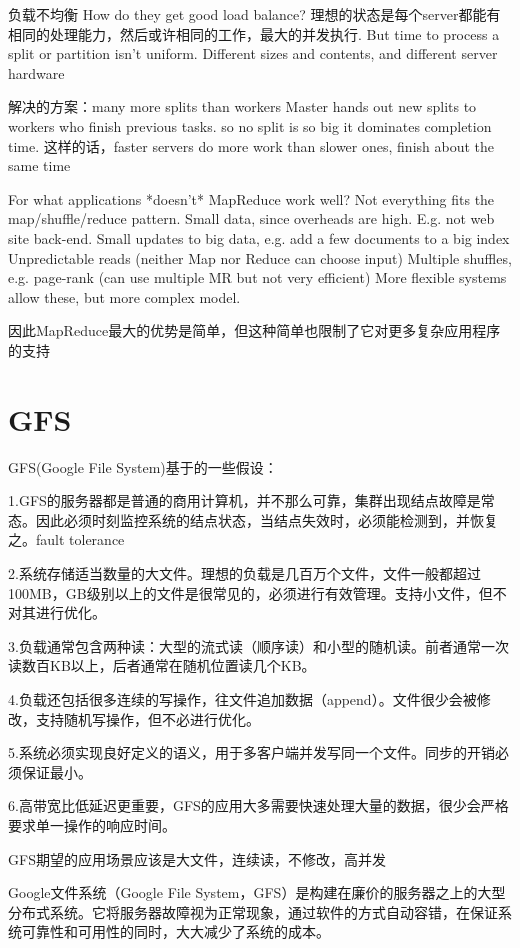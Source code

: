 负载不均衡
How do they get good load balance?
理想的状态是每个server都能有相同的处理能力，然后或许相同的工作，最大的并发执行.
But time to process a split or partition isn't uniform.
Different sizes and contents, and different server hardware

解决的方案：many more splits than workers
Master hands out new splits to workers who finish previous tasks.
so no split is so big it dominates completion time.
这样的话，faster servers do more work than slower ones, finish about the same time

For what applications *doesn't* MapReduce work well?
  Not everything fits the map/shuffle/reduce pattern.
  Small data, since overheads are high. E.g. not web site back-end.
  Small updates to big data, e.g. add a few documents to a big index
  Unpredictable reads (neither Map nor Reduce can choose input)
  Multiple shuffles, e.g. page-rank (can use multiple MR but not very efficient)
  More flexible systems allow these, but more complex model.

因此MapReduce最大的优势是简单，但这种简单也限制了它对更多复杂应用程序的支持

\section{GFS}
GFS(Google File System)基于的一些假设：

1.GFS的服务器都是普通的商用计算机，并不那么可靠，集群出现结点故障是常态。因此必须时刻监控系统的结点状态，当结点失效时，必须能检测到，并恢复之。fault tolerance

2.系统存储适当数量的大文件。理想的负载是几百万个文件，文件一般都超过100MB，GB级别以上的文件是很常见的，必须进行有效管理。支持小文件，但不对其进行优化。

3.负载通常包含两种读：大型的流式读（顺序读）和小型的随机读。前者通常一次读数百KB以上，后者通常在随机位置读几个KB。

4.负载还包括很多连续的写操作，往文件追加数据（append）。文件很少会被修改，支持随机写操作，但不必进行优化。

5.系统必须实现良好定义的语义，用于多客户端并发写同一个文件。同步的开销必须保证最小。

6.高带宽比低延迟更重要，GFS的应用大多需要快速处理大量的数据，很少会严格要求单一操作的响应时间。

GFS期望的应用场景应该是大文件，连续读，不修改，高并发

Google文件系统（Google File System，GFS）是构建在廉价的服务器之上的大型分布式系统。它将服务器故障视为正常现象，通过软件的方式自动容错，在保证系统可靠性和可用性的同时，大大减少了系统的成本。

